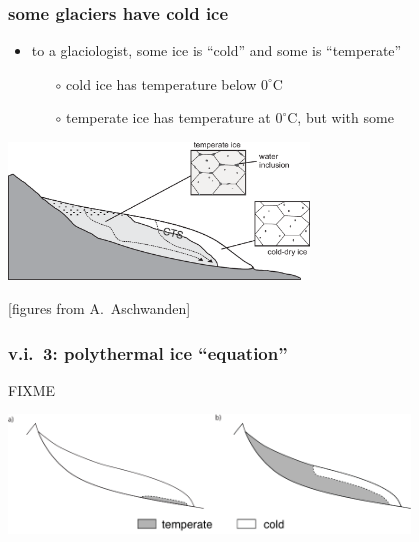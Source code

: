 \documentclass{beamer}
\begin{document}
\begin{frame}
  \frametitle{some glaciers have cold ice}

\begin{itemize}
\item to a glaciologist, some ice is ``cold'' and some is ``temperate''
  \begin{itemize}
  \item[$\circ$] cold ice has temperature below $0^\circ$C
  \item[$\circ$] temperate ice has temperature at $0^\circ$C, but with some
  \end{itemize}
\end{itemize}

\begin{center}
\includegraphics[width=0.6\textwidth]{figs/mws-simplified}

\tiny \hfill [figures from A.~Aschwanden]
\end{center}
\end{frame}


\begin{frame}
  \frametitle{v.i.~3: polythermal ice ``equation''}

FIXME
\begin{center}
\includegraphics[width=0.8\textwidth]{figs/CTSstructures-2land}
\end{center}
\end{frame}
\end{document}
